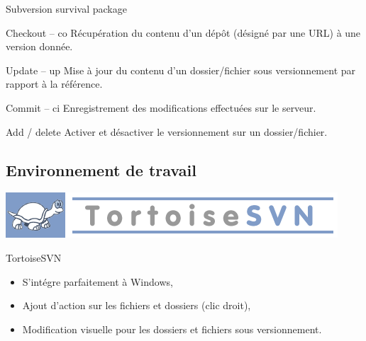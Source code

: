 \begin{frame}{Subversion survival package}
  \begin{block}{Checkout -- co}
    Récupération du contenu d'un dépôt (désigné par une URL) à une version donnée.
  \end{block}
  \begin{block}{Update -- up}
    Mise à jour du contenu d'un dossier/fichier sous versionnement par rapport à la référence.
  \end{block}
  \begin{block}{Commit -- ci}
    Enregistrement des modifications effectuées sur le serveur.
  \end{block}
  \begin{block}{Add / delete}
    Activer et désactiver le versionnement sur un dossier/fichier.
  \end{block}
\end{frame}



\subsection{Environnement de travail}
\begin{frame}
  \begin{center}
    \includegraphics[scale=0.35]{images/logo_tortoise}
  \end{center}
  \begin{alertblock}{TortoiseSVN}
    \begin{itemize}
      \item S'intégre parfaitement à Windows,
      \item Ajout d'action sur les fichiers et dossiers (clic droit),
      \item Modification visuelle pour les dossiers et fichiers sous versionnement.
    \end{itemize}
    \end{alertblock}
\end{frame}

